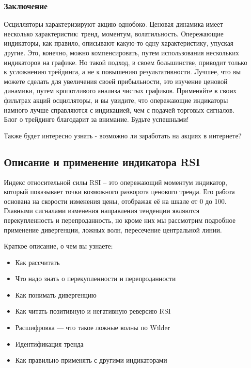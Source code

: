 \documentclass[a5paper]{article}
\begin{document}
\subsubsection{Заключение}

Осцилляторы характеризируют акцию однобоко. Ценовая динамика имеет несколько характеристик: тренд, моментум, волатильность. Опережающие индикаторы, как правило, описывают какую-то одну характеристику, упуская другие. Это, конечно, можно компенсировать, путем использования нескольких индикаторов на графике. Но такой подход, в своем большинстве, приводит только к усложнению трейдинга, а не к повышению результативности. Лучшее, что вы можете сделать для увеличения своей прибыльности, это изучение ценовой динамики, путем кропотливого анализа чистых графиков. Применяйте в своих фильтрах акций осцилляторы, и вы увидите, что опережающие индикаторы намного лучше справляются с индикацией, чем с подачей торговых сигналов. Блог о трейдинге благодарит за внимание. Будьте успешными!


Также будет интересно узнать - возможно ли заработать на акциях в
интернете?

\subsection{Описание и применение индикатора RSI}

Индекс относительной силы RSI – это опережающий моментум индикатор, который показывает точки возможного разворота ценового тренда. Его работа основана на скорости изменения цены, отображая её на шкале от 0 до 100. Главными сигналами изменения направления тенденции являются перекупленность и перепроданность, но кроме них мы рассмотрим подробное применение дивергенции, ложных волн, пересечение центральной линии.

Краткое описание, о чем вы узнаете:
\begin{itemize}
\item         Как рассчитать
\item         Что надо знать о перекупленности и перепроданности
\item         Как понимать дивергенцию
\item         Как читать позитивную и негативную реверсию RSI
\item         Расшифровка — что такое ложные волны по Wilder
\item         Идентификация тренда
\item         Как правильно применять с другими индикаторами
\end{itemize}
\end{document}
